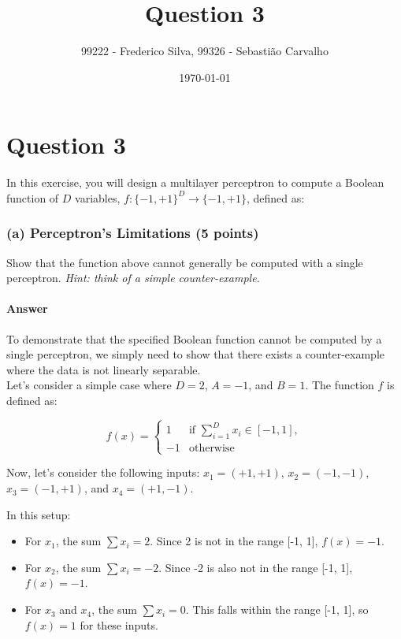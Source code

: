 \documentclass{article}
\title{Question 3}
\author{99222 - Frederico Silva, 99326 - Sebastião Carvalho}
\date{\today}
\begin{document}
\maketitle

\section*{Question 3}
In this exercise, you will design a multilayer perceptron to compute a Boolean function of \( D \) variables, \(f : \{-1,+1\}^D \rightarrow \{-1,+1\} \), defined as:

\subsubsection*{(a) Perceptron's Limitations (5 points)}

Show that the function above cannot generally be computed with a single perceptron. \textit{Hint: think of a simple counter-example.}

\paragraph{Answer}

To demonstrate that the specified Boolean function cannot be computed by a single perceptron, we simply need to show 
that there exists a counter-example where the data is not linearly separable.\\

Let's consider a simple case where \( D = 2 \), \( A = -1 \), and \( B = 1 \). The function \( f \) is defined as:

\[
f(x) = 
\begin{cases} 
1 & \text{if } \sum_{i=1}^{D} x_i \in [-1, 1], \\
-1 & \text{otherwise}
\end{cases}
\]

Now, let's consider the following inputs:
\(x_1 = (+1, +1)\), \(x_2 = (-1, -1)\), \(x_3 = (-1, +1)\), and \(x_4 = (+1, -1)\).

In this setup:

\begin{itemize}
    \item For \( x_1 \), the sum \( \sum x_i = 2 \). Since 2 is not in the range [-1, 1], \( f(x) = -1 \).
    \item For \( x_2 \), the sum \( \sum x_i = -2 \). Since -2 is also not in the range [-1, 1], \( f(x) = -1 \).
    \item For \( x_3 \) and \( x_4 \), the sum \( \sum x_i = 0 \). This falls within the range [-1, 1], so \( f(x) = 1 \) for these inputs.
\end{itemize}
\end{document}
